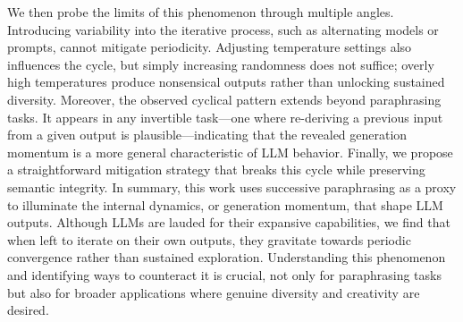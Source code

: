 We then probe the limits of this phenomenon through multiple angles. 
Introducing variability into the iterative process, such as alternating models or prompts, cannot mitigate periodicity. 
Adjusting temperature settings also influences the cycle, but simply increasing randomness does not suffice; overly high temperatures produce nonsensical outputs rather than unlocking sustained diversity. 
Moreover, the observed cyclical pattern extends beyond paraphrasing tasks. 
It appears in any invertible task—one where re-deriving a previous input from a given output is plausible—indicating that the revealed generation momentum is a more general characteristic of LLM behavior. 
Finally, we propose a straightforward mitigation strategy that breaks this cycle while preserving semantic integrity.
In summary, this work uses successive paraphrasing as a proxy to illuminate the internal dynamics, or generation momentum, that shape LLM outputs. Although LLMs are lauded for their expansive capabilities, we find that when left to iterate on their own outputs, they gravitate towards periodic convergence rather than sustained exploration. Understanding this phenomenon and identifying ways to counteract it is crucial, not only for paraphrasing tasks but also for broader applications where genuine diversity and creativity are desired.












